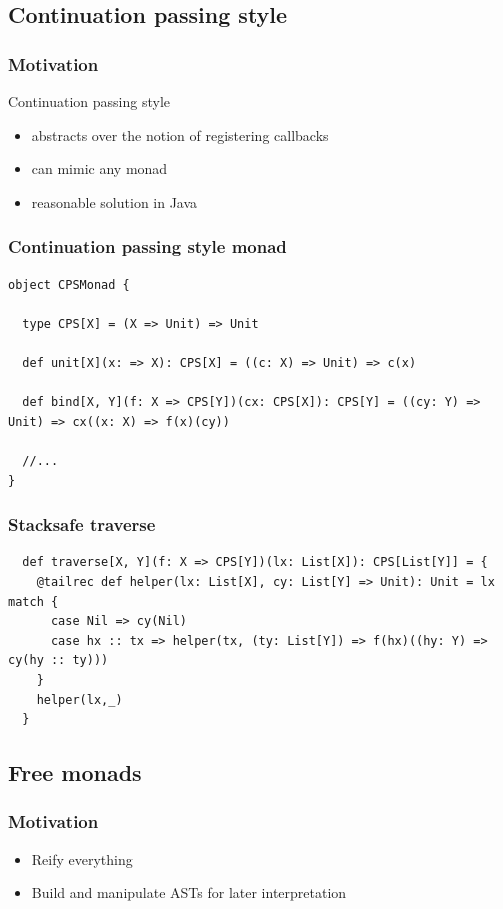 \documentclass{beamer}
\begin{document}
\subsection{Continuation passing style}
\begin{frame}
\frametitle{Motivation}
Continuation passing style
\begin{itemize}
\item abstracts over the notion of registering callbacks
\item can mimic any monad
\item reasonable solution in Java
\end{itemize}
\end{frame}

\begin{frame}[fragile]
\frametitle{Continuation passing style monad}
\begin{lstlisting}
object CPSMonad {

  type CPS[X] = (X => Unit) => Unit

  def unit[X](x: => X): CPS[X] = ((c: X) => Unit) => c(x)

  def bind[X, Y](f: X => CPS[Y])(cx: CPS[X]): CPS[Y] = ((cy: Y) => Unit) => cx((x: X) => f(x)(cy))
  
  //...
}
\end{lstlisting}
\end{frame}
\begin{frame}[fragile]
\frametitle{Stacksafe traverse}
\begin{lstlisting}
  def traverse[X, Y](f: X => CPS[Y])(lx: List[X]): CPS[List[Y]] = {
    @tailrec def helper(lx: List[X], cy: List[Y] => Unit): Unit = lx match {
      case Nil => cy(Nil)
      case hx :: tx => helper(tx, (ty: List[Y]) => f(hx)((hy: Y) => cy(hy :: ty)))
    }
    helper(lx,_)
  }
\end{lstlisting}
\end{frame}

\subsection{Free monads}
\begin{frame}
\frametitle{Motivation}
\begin{itemize}
\item Reify everything
\item Build and manipulate ASTs for later interpretation
\end{itemize}
\end{frame}
\end{document}
